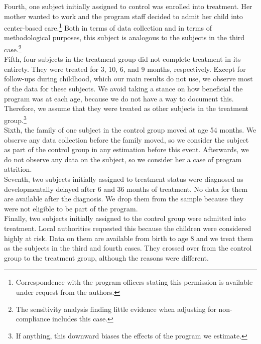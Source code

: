\begin{appendices}


\noindent Fourth, one subject initially assigned to control was enrolled into treatment. Her mother wanted to work and the program staff decided to admit her child into center-based care.\footnote{Correspondence with the program officers stating this permission is available under request from the authors.} Both in terms of data collection and in terms of methodological purposes, this subject is analogous to the subjects in the third case.\footnote{The sensitivity analysis finding little evidence when adjusting for non-compliance includes this case.}\\

\noindent Fifth, four subjects in the treatment group did not complete treatment in its entirety. They were treated for 3, 10, 6, and 9 months, respectively. Except for follow-ups during childhood, which our main results do not use, we observe most of the data for these subjects. We avoid taking a stance on how beneficial the program was at each age, because we do not have a way to document this. Therefore, we assume that they were treated as other subjects in the treatment group.\footnote{If anything, this downward biases the effects of the program we estimate.} \\

\noindent Sixth, the family of one subject in the control group moved at age 54 months. We observe any data collection before the family moved, so we consider the subject as part of the control group in any estimation before this event. Afterwards, we do not observe any data on the subject, so we consider her a case of program attrition.\\

\noindent Seventh, two subjects initially assigned to treatment status were diagnosed as developmentally delayed after 6 and 36 months of treatment. No data for them are available after the diagnosis. We drop them from the sample because they were not eligible to be part of the program.\\

\noindent Finally, two subjects initially assigned to the control group were admitted into treatment. Local authorities requested this because the children were considered highly at risk. Data on them are available from birth to age 8 and we treat them as the subjects in the third and fourth cases. They crossed over from the control group to the treatment group, although the reasons were different.\\


\end{appendices}
